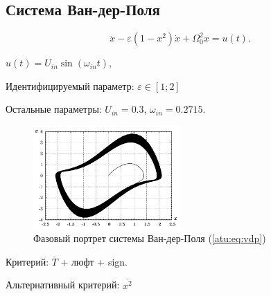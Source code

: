 
\FloatBarrier
\subsection{Система Ван-дер-Поля} %


\begin{equation}
 \ddot{x} - \varepsilon (1-x^2)  \dot{x} + \Omega_0^2 x  = u(t) .
\label{atu:eq:vdp}
\end{equation}

\( u(t) = U_{in} \sin ( \omega_{in} t ) \),

Идентифицируемый параметр:
\( \varepsilon \in [1;2]  \)

Остальные параметры:
\(U_{in}=0.3\),
\(\omega_{in}=0.2715\).


\begin{figure}[htb!]
\centerline{\includegraphics[width=0.5\textwidth]{p/cha/vdp_phase.pdf} }
\caption{Фазовый портрет системы Ван-дер-Поля (\ref{atu:eq:vdp})}
\label{atu:f:vdp_phase}
\end{figure}

Критерий:
$\overline{T}$ + люфт + sign.

Альтернативный критерий:
$\overline{x^2}$


